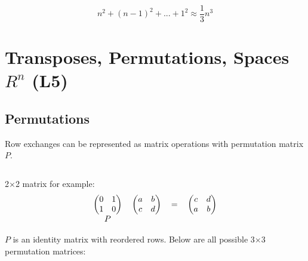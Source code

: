 \documentclass[12pt]{article}
\begin{document}
\[n^2+(n-1)^2+...+1^2\approx{\frac{1}{3}n^3}\]

\newpage

\section{Transposes, Permutations, Spaces $R^n$ (L5)}

\subsection{Permutations}
Row exchanges can be represented as matrix operations with permutation matrix $P$.

$\>$

2$\times$2 matrix for example:
\[
\begin{tabular}{cccc}
    $\left(
        \begin{matrix}
            0 & 1\\
            1 & 0
        \end{matrix}
    \right)$ &
    $\left(
        \begin{matrix}
            a & b\\
            c & d
        \end{matrix}
    \right)$ &
    $=$ &
    $\left(
        \begin{matrix}
            c & d\\
            a & b
        \end{matrix}
    \right)$\\
    $P$ & & &
  \end{tabular}
\]

$P$ is an identity matrix with reordered rows. Below are all possible 3$\times$3 permutation matrices:
\end{document}
